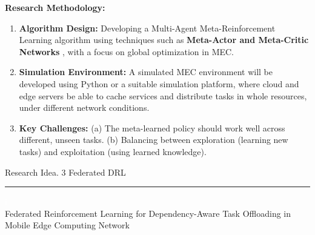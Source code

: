 \documentclass[12pt]{article}
\begin{document}
\vspace{5mm}

\noindent\textbf{\large Research Methodology:}

\begin{enumerate}  \item \textbf{Algorithm Design:} Developing a Multi-Agent Meta-Reinforcement Learning algorithm using techniques such as \textbf{Meta-Actor and Meta-Critic Networks} \cite{ding2023multiagent}, with a focus on global optimization in MEC.\vspace{-1mm}
	
	\item \textbf{Simulation Environment:} A simulated MEC environment will be developed using Python or a suitable simulation platform, where cloud and edge servers be able to cache services and distribute tasks in whole resources, under different network conditions. 
	
	\item \textbf{Key Challenges:}  (a) The meta-learned policy should work well across different, unseen tasks. (b) Balancing between exploration (learning new tasks) and exploitation (using learned knowledge). 
\end{enumerate}


\newpage



\begin{center} 
	
	
	\vspace{-17mm}
	
	\large Research Idea. 3  \hfill Federated DRL \vspace{1mm} \hrule
	
	\vspace{-1mm}
	
	
	
	
	\textcolor{white}{i} \\ \LARGE Federated Reinforcement Learning for Dependency-Aware Task Offloading in Mobile Edge Computing Network\vspace{6mm}\\
	
\end{center}
\vspace{-5mm}
\end{document}
